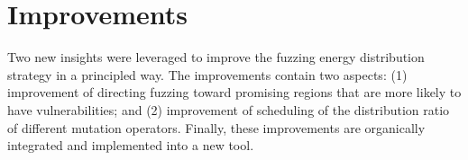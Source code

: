 \section{Improvements} \label{approach}
Two new insights were leveraged to improve the fuzzing energy distribution strategy in a principled way. The improvements contain two aspects: (1) improvement of directing fuzzing toward promising regions that are more likely to have vulnerabilities; and (2) improvement of scheduling of the distribution ratio of different mutation operators.  Finally,  these improvements are organically integrated and implemented into a new tool.

%
% 
%

